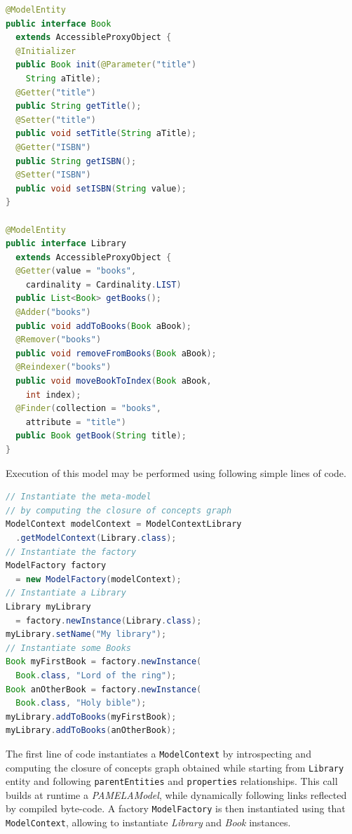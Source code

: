 \begin{lstlisting}[language=Java,basicstyle=\ttfamily\footnotesize]
@ModelEntity
public interface Book 
  extends AccessibleProxyObject {
  @Initializer
  public Book init(@Parameter("title") 
    String aTitle);
  @Getter("title")
  public String getTitle();
  @Setter("title")
  public void setTitle(String aTitle);
  @Getter("ISBN")
  public String getISBN();
  @Setter("ISBN")
  public void setISBN(String value);
}

@ModelEntity
public interface Library
  extends AccessibleProxyObject {
  @Getter(value = "books", 
    cardinality = Cardinality.LIST)
  public List<Book> getBooks();
  @Adder("books")
  public void addToBooks(Book aBook);
  @Remover("books")
  public void removeFromBooks(Book aBook);
  @Reindexer("books")
  public void moveBookToIndex(Book aBook, 
    int index);
  @Finder(collection = "books",
    attribute = "title")
  public Book getBook(String title);
}
\end{lstlisting}

Execution of this model may be performed using following simple lines of code.

\begin{lstlisting}[language=Java,basicstyle=\ttfamily\footnotesize]
// Instantiate the meta-model
// by computing the closure of concepts graph
ModelContext modelContext = ModelContextLibrary
  .getModelContext(Library.class);
// Instantiate the factory
ModelFactory factory 
  = new ModelFactory(modelContext);
// Instantiate a Library
Library myLibrary 
  = factory.newInstance(Library.class);
myLibrary.setName("My library");
// Instantiate some Books
Book myFirstBook = factory.newInstance(
  Book.class, "Lord of the ring");
Book anOtherBook = factory.newInstance(
  Book.class, "Holy bible");
myLibrary.addToBooks(myFirstBook);
myLibrary.addToBooks(anOtherBook);
\end{lstlisting}

The first line of code instantiates a \texttt{ModelContext} by introspecting and computing the closure of concepts graph obtained while starting from \texttt{Library} entity and following \texttt{parentEntities} and \texttt{properties} relationships. This call builds at runtime a \emph{PAMELAModel}, while dynamically following links reflected by compiled byte-code. A factory \texttt{ModelFactory} is then instantiated using that \texttt{ModelContext}, allowing to instantiate \emph{Library} and \emph{Book} instances.

